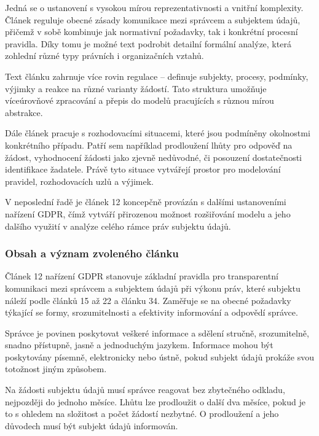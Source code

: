 Jedná se o ustanovení s vysokou mírou reprezentativnosti a vnitřní komplexity. Článek reguluje obecné zásady komunikace mezi správcem a subjektem údajů, přičemž v sobě kombinuje jak normativní požadavky, tak i konkrétní procesní pravidla. Díky tomu je možné text podrobit detailní formální analýze, která zohlední různé typy právních i organizačních vztahů.

Text článku zahrnuje více rovin regulace – definuje subjekty, procesy, podmínky, výjimky a reakce na různé varianty žádostí. Tato struktura umožňuje víceúrovňové zpracování a přepis do modelů pracujících s různou mírou abstrakce.

Dále článek pracuje s rozhodovacími situacemi, které jsou podmíněny okolnostmi konkrétního případu. Patří sem například prodloužení lhůty pro odpověď na žádost, vyhodnocení žádosti jako zjevně nedůvodné, či posouzení dostatečnosti identifikace žadatele. Právě tyto situace vytvářejí prostor pro modelování pravidel, rozhodovacích uzlů a výjimek.

V neposlední řadě je článek 12 koncepčně provázán s dalšími ustanoveními nařízení GDPR, čímž vytváří přirozenou možnost rozšiřování modelu a jeho dalšího využití v analýze celého rámce práv subjektu údajů. \cite{clanek12}


\subsubsection{Obsah a význam zvoleného článku}
\label{sec:obsah-a-vyznam-zvoleneho-clanku}
Článek 12 nařízení GDPR stanovuje základní pravidla pro transparentní komunikaci mezi správcem a subjektem údajů při výkonu práv, které subjektu náleží podle článků 15 až 22 a článku 34. Zaměřuje se na obecné požadavky týkající se formy, srozumitelnosti a efektivity informování a odpovědí správce.

Správce je povinen poskytovat veškeré informace a sdělení stručně, srozumitelně, snadno přístupně, jasně a jednoduchým jazykem.  Informace mohou být poskytovány písemně, elektronicky nebo ústně, pokud subjekt údajů prokáže svou totožnost jiným způsobem.

Na žádosti subjektu údajů musí správce reagovat bez zbytečného odkladu, nejpozději do jednoho měsíce. Lhůtu lze prodloužit o další dva měsíce, pokud je to s ohledem na složitost a počet žádostí nezbytné. O prodloužení a jeho důvodech musí být subjekt údajů informován.

